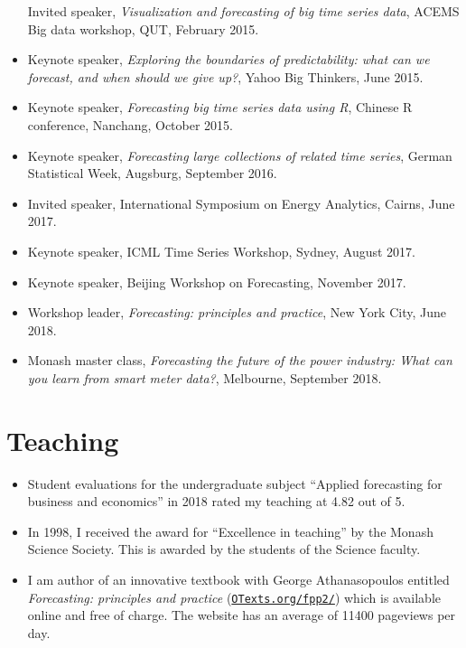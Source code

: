 \documentclass[10pt,a4paper,]{article}
\providecommand{\tightlist}{%
  \setlength{\itemsep}{0pt}\setlength{\parskip}{0pt}}
\begin{document}
\begin{itemize}
  Invited speaker, \emph{Visualization and forecasting of big time
  series data}, ACEMS Big data workshop, QUT, February 2015.
\item
  Keynote speaker, \emph{Exploring the boundaries of predictability:
  what can we forecast, and when should we give up?}, Yahoo Big
  Thinkers, June 2015.
\item
  Keynote speaker, \emph{Forecasting big time series data using R},
  Chinese R conference, Nanchang, October 2015.
\item
  Keynote speaker, \emph{Forecasting large collections of related time
  series}, German Statistical Week, Augsburg, September 2016.
\item
  Invited speaker, International Symposium on Energy Analytics, Cairns,
  June 2017.
\item
  Keynote speaker, ICML Time Series Workshop, Sydney, August 2017.
\item
  Keynote speaker, Beijing Workshop on Forecasting, November 2017.
\item
  Workshop leader, \emph{Forecasting: principles and practice}, New York
  City, June 2018.
\item
  Monash master class, \emph{Forecasting the future of the power
  industry: What can you learn from smart meter data?}, Melbourne,
  September 2018.
\end{itemize}

\hypertarget{teaching}{%
\section{Teaching}\label{teaching}}

\begin{itemize}
\tightlist
\item
  Student evaluations for the undergraduate subject ``Applied
  forecasting for business and economics'' in 2018 rated my teaching at
  4.82 out of 5.
\item
  In 1998, I received the award for ``Excellence in teaching'' by the
  Monash Science Society. This is awarded by the students of the Science
  faculty.
\item
  I am author of an innovative textbook with George Athanasopoulos
  entitled \emph{Forecasting: principles and practice}
  (\href{https://OTexts.org/fpp2}{\texttt{OTexts.org/fpp2/}}) which is
  available online and free of charge. The website has an average of
  11400 pageviews per day.
\end{itemize}
\end{document}
